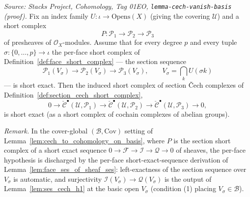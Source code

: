 \begin{lemma}\leanok
  \label{lem:cech_ses_of_basis}
  \textit{Source: Stacks Project, Cohomology, Tag 01EO,
  \texttt{lemma-cech-vanish-basis} (proof).}
  Fix an index family \(U : \iota \to \mathrm{Opens}(X)\) (giving the covering \(\mathcal{U}\)) and a
  short complex
  \[
    P : \mathcal{P}_1 \to \mathcal{P}_2 \to \mathcal{P}_3
  \]
  of presheaves of \(\mathcal{O}_X\)-modules. Assume that for every degree \(p\) and every tuple
  \(\sigma : \{0, \ldots, p\} \to \iota\) the per-face short complex of
  Definition~\ref{def:face_short_complex} — the section sequence
  \[
    \mathcal{P}_1(V_\sigma) \longrightarrow \mathcal{P}_2(V_\sigma) \longrightarrow
      \mathcal{P}_3(V_\sigma), \qquad V_\sigma = \bigcap_k U(\sigma k)
  \]
  — is short exact. Then the induced short complex of section {\v C}ech complexes of
  Definition~\ref{def:section_cech_short_complex},
  \[
    0 \to \check{\mathcal{C}}^\bullet(\mathcal{U}, \mathcal{P}_1) \to
      \check{\mathcal{C}}^\bullet(\mathcal{U}, \mathcal{P}_2) \to
      \check{\mathcal{C}}^\bullet(\mathcal{U}, \mathcal{P}_3) \to 0,
  \]
  is short exact (as a short complex of cochain complexes of abelian groups).

  \emph{Remark.} In the cover-global \((\mathcal{B}, \mathrm{Cov})\) setting of
  Lemma~\ref{lem:cech_to_cohomology_on_basis}, where \(P\) is the section short complex of a short
  exact sequence \(0 \to \mathcal{F} \to \mathcal{I} \to \mathcal{Q} \to 0\) of sheaves, the per-face
  hypothesis is discharged by the per-face short-exact-sequence derivation of
  Lemma~\ref{lem:face_ses_of_sheaf_ses}: left-exactness of the section sequence over \(V_\sigma\) is
  automatic, and surjectivity \(\mathcal{I}(V_\sigma) \to \mathcal{Q}(V_\sigma)\) is the output of
  Lemma~\ref{lem:ses_cech_h1} at the basic open \(V_\sigma\) (condition (1) placing \(V_\sigma \in
  \mathcal{B}\)).
\end{lemma}

